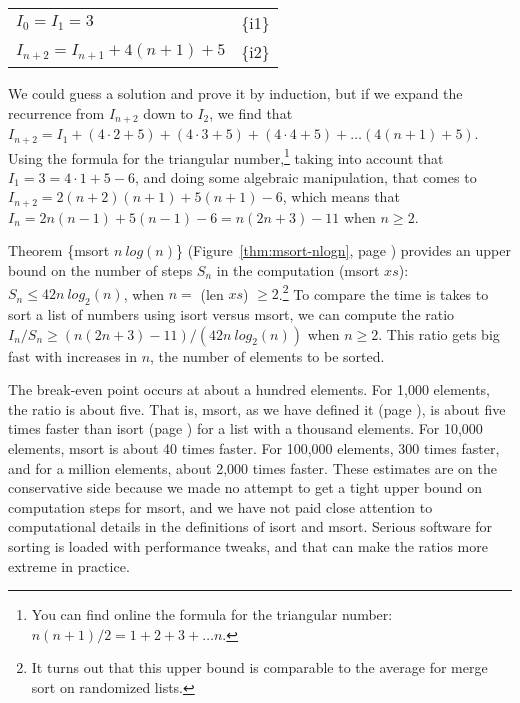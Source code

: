 \begin{center}
\begin{tabular}{ll}
$I_0 = I_1 = 3$              & \{i1\} \\
$I_{n+2} = I_{n+1} + 4(n+1) + 5$ & \{i2\} \\
\end{tabular}
\end{center}

We could guess a solution and prove it by induction,
but if we expand the recurrence from $I_{n+2}$ down to $I_2$,
we find that
$I_{n+2} = I_1 + (4\cdot 2 + 5) + (4\cdot 3 + 5) + (4\cdot 4 + 5) + \dots (4(n+1) + 5)$.
Using the formula for the triangular number,\footnote{You can find online 
the formula for the triangular number: $n(n+1)/2 = 1 + 2 + 3 + \dots n$.}
taking into account that $I_1 = 3 = 4\cdot 1+5-6$, and doing some algebraic manipulation,
that comes to $I_{n+2} = 2(n+2)(n+1) + 5(n+1) - 6$, which means that
$I_{n} = 2n(n-1) + 5(n-1) - 6 = n(2n+3)-11$ when $n \geq 2$.

Theorem \{msort $n~log(n)$\}
(Figure~\ref{thm:msort-nlogn}, page \pageref{thm:msort-nlogn}) provides
an upper bound on the number of steps $S_n$ in the computation (msort $xs$):
$S_{n} \leq 42n~log_2(n)$, when $n =$ (len $xs$) $\geq 2$.\footnote{It
turns out that this upper bound is comparable to the average
for merge sort on randomized lists.}
To compare the time is takes to sort a list of numbers using isort versus msort,
we can compute the ratio $I_n/S_n \geq (n(2n+3)-11)/(42n~log_2(n))$ when $n \geq 2$.
This ratio gets big fast with increases in $n$, the number of elements to be sorted.

The break-even point occurs at about a hundred elements.
For 1,000 elements, the ratio is about five.
That is, msort, as we have defined it (page \pageref{defun:msort-copy}),
is about five times faster
than isort (page \pageref{defun:insert-isort})
for a list with a thousand elements.
For 10,000 elements, msort is about 40 times faster.
For 100,000 elements, 300 times faster,
and for a million elements, about 2,000 times faster.
These estimates are on the conservative side
because we made no attempt to get a tight
upper bound on computation steps for msort,
and we have not paid close attention to computational details
in the definitions of isort and  msort.
Serious software for sorting is loaded with performance tweaks,
and that can make the ratios more extreme in practice.

